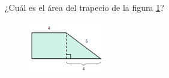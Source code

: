 ¿Cuál es el \'area del trapecio de la figura \ref{fig:area_compuesta_02}?
\begin{figure}[H]
    \begin{center}
        \includegraphics[width=0.3\textwidth]{../images/area_compuesta_02.png}
    \end{center}
    \caption{}
    \label{fig:area_compuesta_02}
\end{figure}

\begin{solutionbox}{13cm}
\end{solutionbox}

